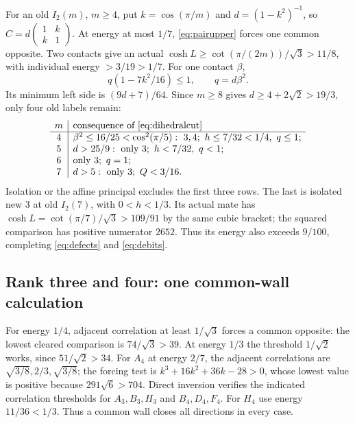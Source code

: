 \documentclass[11pt]{article}
\theoremstyle{remark}
\begin{document}
For an old $I_2(m)$, $m\ge4$, put $k=\cos(\pi/m)$ and
$d=(1-k^2)^{-1}$, so $C=d\left(\begin{smallmatrix}1&k\\k&1\end{smallmatrix}\right)$.
At energy at most $1/7$, \eqref{eq:pairupper} forces one common
opposite. Two contacts give an actual
$\cosh L\ge\cot(\pi/(2m))/\sqrt3>11/8$, with individual energy
$>3/19>1/7$. For one contact $\beta$,
\begin{equation}\label{eq:dihedralcut}
 q(1-7k^2/16)\le1,\qquad q=d\beta^2.
\end{equation}
Its minimum left side is $(9d+7)/64$. Since
$m\ge8$ gives $d\ge4+2\sqrt2>19/3$, only four old labels remain:
\[
\begin{array}{c|l}
m&\text{consequence of \eqref{eq:dihedralcut}}\\ \hline
4&\beta^2\le16/25<\cos^2(\pi/5):\ 3,4;\ h\le7/32<1/4,\ q\le1;\\
5&d>25/9:\ \text{only }3;\ h<7/32,\ q<1;\\
6&\text{only }3;\ q=1;\\
7&d>5:\ \text{only }3;\ Q<3/16.
\end{array}
\]
Isolation or the affine principal excludes the first three rows.
The last is isolated new $3$ at old $I_2(7)$, with $0<h<1/3$.
Its actual mate has $\cosh L=\cot(\pi/7)/\sqrt3>109/91$ by the
same cubic bracket; the squared comparison has positive numerator
$2652$. Thus its energy also exceeds $9/100$, completing
\eqref{eq:defects} and \eqref{eq:debits}.

\subsection{Rank three and four: one common-wall calculation}

For energy $1/4$, adjacent correlation at least $1/\sqrt3$ forces
a common opposite: the lowest cleared comparison is
$74/\sqrt3>39$. At energy $1/3$ the threshold $1/\sqrt2$ works,
since $51/\sqrt2>34$. For $A_4$ at energy $2/7$, the adjacent
correlations are $\sqrt{3/8},2/3,\sqrt{3/8}$; the forcing test is
$k^3+16k^2+36k-28>0$, whose lowest value is positive because
$291\sqrt6>704$. Direct inversion verifies the indicated
correlation thresholds for $A_3,B_3,H_3$ and $B_4,D_4,F_4$.
For $H_4$ use energy $11/36<1/3$. Thus a common wall closes all
directions in every case.
\end{document}
